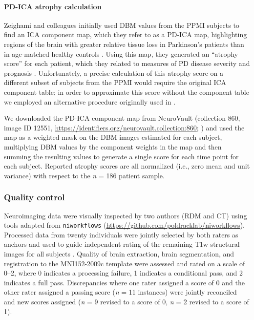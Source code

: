 \documentclass[12pt,aps,pra,reprint,showkeys]{revtex4-1}
\begin{document}
\paragraph*{PD-ICA atrophy calculation}

Zeighami and colleagues initially used DBM values from the PPMI subjects to find an ICA component map, which they refer to as a PD-ICA map, highlighting regions of the brain with greater relative tissue loss in Parkinson's patients than in age-matched healthy controls \citep{zeighami2015network}.
Using this map, they generated an ``atrophy score'' for each patient, which they related to measures of PD disease severity and prognosis \citep{zeighami2015network, zeighami2019mri}.
Unfortunately, a precise calculation of this atrophy score on a different subset of subjects from the PPMI would require the original ICA component table; in order to approximate this score without the component table we employed an alternative procedure originally used in \citep{zeighami2019mri}.

We downloaded the PD-ICA component map from NeuroVault (collection 860, image ID 12551, \url{https://identifiers.org/neurovault.collection:860}; \citep{gorgolewski2015neurovault}) and used the map as a weighted mask on the DBM images estimated for each subject, multiplying DBM values by the component weights in the map and then summing the resulting values to generate a single score for each time point for each subject.
Reported atrophy scores are all normalized (i.e., zero mean and unit variance) with respect to the \emph{n} = 186 patient sample.

\subsubsection*{Quality control}

Neuroimaging data were visually inspected by two authors (RDM and CT) using tools adapted from \texttt{niworkflows} (\url{https://github.com/poldracklab/niworkflows}).
Processed data from twenty individuals were jointly selected by both raters as anchors and used to guide independent rating of the remaining T1w structural images for all subjects \citep{rosen2018quantitative}.
Quality of brain extraction, brain segmentation, and registration to the MNI152-2009c template were assessed and rated on a scale of 0--2, where 0 indicates a processing failure, 1 indicates a conditional pass, and 2 indicates a full pass.
Discrepancies where one rater assigned a score of 0 and the other rater assigned a passing score (\emph{n} = 11 instances) were jointly reconciled and new scores assigned (\emph{n} = 9 revised to a score of 0, \emph{n} = 2 revised to a score of 1).
\end{document}
